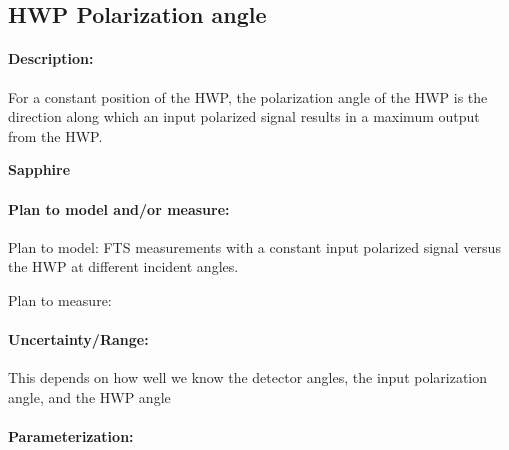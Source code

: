 \subsection{HWP Polarization angle}

\paragraph{Description:}
For a constant position of the HWP, the polarization angle of the HWP is the 
          direction along which an input polarized signal results in a maximum output from the 
          HWP.

\textbf{Sapphire}

\paragraph{Plan to model and/or measure:}
Plan to model: FTS measurements with a constant input polarized signal versus 
          the HWP at different incident angles.

Plan to measure:


\paragraph{Uncertainty/Range:} This depends on
          how well we know the detector angles,
          the input polarization angle, and the
          HWP angle

\paragraph{Parameterization:}

